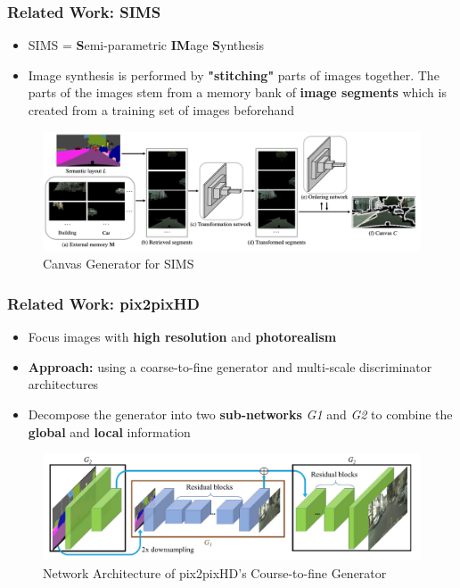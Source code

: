 \documentclass{beamer}
\begin{document}
\begin{frame}
\frametitle{Related Work: SIMS}
    \begin{itemize}
        \item SIMS = \textbf{S}emi-parametric \textbf{IM}age \textbf{S}ynthesis
    	\item Image synthesis is performed by \textbf{"stitching"} parts of images together. The parts of the images stem from a memory bank of \textbf{image segments} which is created from a training set of images beforehand
    	\cite{qi2018semi}
    \end{itemize}
    \begin{figure}
    \includegraphics[scale=0.45]{figures/sims_architecture.png}
    \caption{Canvas Generator for SIMS}
    \end{figure}
\end{frame}

\begin{frame}
\frametitle{Related Work: pix2pixHD}
\begin{itemize}
	\item Focus images with \textbf{high resolution} and \textbf{photorealism}
	\item \textbf{Approach:} using a coarse-to-fine generator and multi-scale discriminator architectures
    \item Decompose the generator into two \textbf{sub-networks} \textit{G1} and \textit{G2} to combine the \textbf{global} and \textbf{local} information \cite{wang2018high}
\end{itemize}
\centering
\begin{figure}
\includegraphics[scale=0.55]{figures/pix2pixHD.png} 
\caption{Network Architecture of pix2pixHD's Course-to-fine Generator}
\end{figure}
\end{frame}
\end{document}
